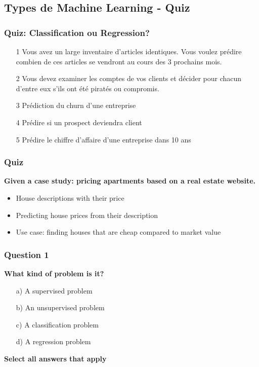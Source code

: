 \documentclass{beamer}
\begin{document}
\subsection{Types de Machine Learning - Quiz}
	\begin{frame}
	\frametitle{Quiz: Classification ou Regression?}
\begin{itemize}
	\item[1]  Vous avez un large inventaire d'articles identiques. Vous voulez prédire
	combien de ces articles se vendront au cours des 3 prochains mois.
	\item[2]  Vous devez examiner les comptes de vos clients et décider pour chacun d’entre eux s'ils ont été piratés ou compromis. 
	\item[3] Prédiction du churn d'une entreprise
	\item[4] Prédire si un prospect deviendra client
	\item[5] Prédire le chiffre d'affaire d'une entreprise dans 10 ans
\end{itemize}	
\end{frame}		
	
\begin{frame}
	\frametitle{Quiz }
	
	\begin{center}
		\textbf{Given a case study: pricing apartments based on a real estate website.}
	\end{center}
	
	\vspace{0.5cm}
	
	\begin{itemize}
		\item House descriptions with their price
		\item Predicting house prices from their description
		\item Use case: finding houses that are cheap compared to market value
	\end{itemize}
	
\end{frame}

\begin{frame}
	\frametitle{Question 1}
	
	\textbf{What kind of problem is it?}
	
	\begin{enumerate}
		\item[a)] A supervised problem
		\item[b)] An unsupervised problem
		\item[c)] A classification problem
		\item[d)] A regression problem
	\end{enumerate}
	
	\vspace{0.5cm}
	
	\textbf{Select all answers that apply}
	
\end{frame}
\end{document}

